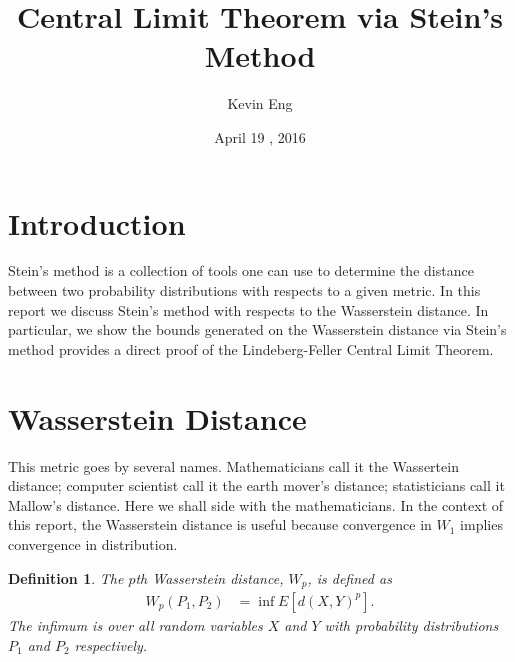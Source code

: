 \documentclass[11pt]{article}
\title{Central Limit Theorem via Stein's Method}
\date{April 19 , 2016}
\author{Kevin Eng}
\newtheorem*{defin}{Definition}
\begin{document}
\maketitle
\begin{flushleft}

\section{Introduction}
Stein's method is a collection of tools one can use to
determine the distance between two probability distributions
with respects to a given metric. In this report we discuss
Stein's method with respects to the Wasserstein distance.
In particular, we show the bounds generated on the Wasserstein distance
via Stein's method provides a direct proof of the Lindeberg-Feller Central
Limit Theorem.

\section{Wasserstein Distance}
This metric goes by several names. Mathematicians call it the Wassertein distance; computer scientist call it the earth mover's distance; statisticians call it Mallow's distance. Here
we shall side with the mathematicians. In the context of this report, the Wasserstein distance is useful because convergence in
$W_1$ implies convergence in distribution.

\begin{defin}
  The $p$th Wasserstein distance, $W_p$, is defined as
  \begin{align*}
    W_p(P_1,P_2) &= \inf E[d(X,Y)^p].
  \end{align*}
  The infimum is over all random variables $X$ and $Y$ with probability distributions
  $P_1$ and $P_2$ respectively.
  \end{defin}




\end{flushleft}
\end{document}
